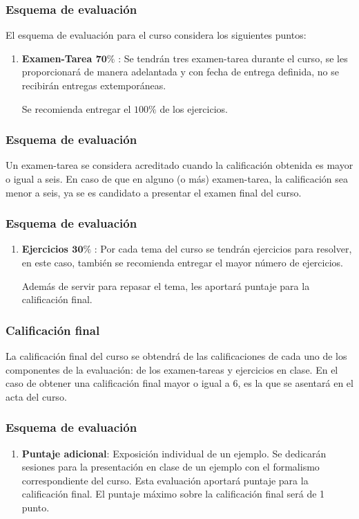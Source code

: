 \documentclass[12pt]{beamer}
\begin{document}
\begin{frame}
\frametitle{Esquema de evaluación}
El esquema de evaluación para el curso considera los siguientes puntos:
\pause
{}
\begin{enumerate}[<+->]
\item \textbf{Examen-Tarea $\mathbf{70\%}$} : Se tendrán tres examen-tarea durante el curso, se les proporcionará de manera adelantada y con fecha de entrega definida, no se recibirán entregas extemporáneas. 

Se recomienda entregar el $100\%$ de los ejercicios.
\seti
\end{enumerate}
\end{frame}
\begin{frame}
\frametitle{Esquema de evaluación}
Un examen-tarea se considera acreditado cuando la calificación obtenida es mayor o igual a seis. En caso de que en alguno (o más) examen-tarea, la calificación sea menor a seis, ya se es candidato a presentar el examen final del curso.
\end{frame}
\begin{frame}
\frametitle{Esquema de evaluación}
\begin{enumerate}[<+->]
\conti
\item \textbf{Ejercicios $\mathbf{30\%}$} : Por cada tema del curso se tendrán ejercicios para resolver, en este caso, también se recomienda entregar el mayor número de ejercicios.

Además de servir para repasar el tema, les aportará puntaje para la calificación final.
\seti
\end{enumerate}
\end{frame}
\begin{frame}
\frametitle{Calificación final}
La calificación final del curso se obtendrá de las calificaciones de cada uno de los componentes de la evaluación: de los examen-tareas y ejercicios en clase. En el caso de obtener una calificación final mayor o igual a $6$, es la que se asentará en el acta del curso.
\end{frame}
\begin{frame}
\frametitle{Esquema de evaluación}
\begin{enumerate}[<+->]
\conti
\item \textbf{Puntaje adicional}: Exposición individual de un ejemplo.
\pause
Se dedicarán sesiones para la presentación en clase de un ejemplo con el formalismo correspondiente del curso. 
\pause
Esta evaluación aportará puntaje para la calificación final. El puntaje máximo sobre la calificación final será de 1 punto.
\end{enumerate}
\end{frame}
\end{document}
